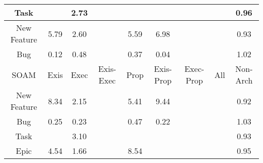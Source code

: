\begin{tabular}{|c||c|c|c|c|c|c|c|c|}
\hline
Task &  & \cellcolor[rgb]{0.9031359919544031,0.836748627767875,0.42} 2.73 &  &  &  &  &  & \cellcolor[rgb]{0.903809566671528,0.8106986155785654,0.4142222622267594} 0.96 \\ 
\hline
New Feature & \cellcolor[rgb]{0.8910131471165075,0.8310062275815036,0.42} 5.79 & \cellcolor[rgb]{0.9036683057320163,0.8370007763993761,0.42} 2.60 &  & \cellcolor[rgb]{0.8918075653773483,0.8313825309682176,0.42} 5.59 & \cellcolor[rgb]{0.8862944058545417,0.8287710343521514,0.42} 6.98 &  &  & \cellcolor[rgb]{0.8984855829276015,0.7854984258573136,0.40925321073242804} 0.93 \\ 
\hline
Bug & \cellcolor[rgb]{0.7720169098155485,0.1868800397935963,0.29121578249451197} 0.12 & \cellcolor[rgb]{0.8292482735436717,0.4577751614400464,0.34463172197409364} 0.48 &  & \cellcolor[rgb]{0.8121367712742666,0.37678071736486163,0.3286609865226488} 0.37 & \cellcolor[rgb]{0.76,0.13,0.28} 0.04 &  &  & \cellcolor[rgb]{0.9099289440633023,0.839966341924722,0.42} 1.02 \\ 
\hline
\hline
SOAM & Exis & Exec & Exis-Exec & Prop & Exis-Prop & Exec-Prop & All & Non-Arch \\ 
\hline
New Feature & \cellcolor[rgb]{0.8809441516260168,0.8262367034017974,0.42} 8.34 & \cellcolor[rgb]{0.9054452823761975,0.8378425021781988,0.42} 2.15 &  & \cellcolor[rgb]{0.8925251898831912,0.8317224583657221,0.42} 5.41 & \cellcolor[rgb]{0.8765612264902435,0.8241605809690626,0.42} 9.44 &  &  & \cellcolor[rgb]{0.8968157959473898,0.7775947674843112,0.40769474288423035} 0.92 \\ 
\hline
Bug & \cellcolor[rgb]{0.7921872601354328,0.2823530313077155,0.31004144279307067} 0.25 & \cellcolor[rgb]{0.7899709581221919,0.27186253511170816,0.3079728942473791} 0.23 &  & \cellcolor[rgb]{0.826353843986855,0.4440748615377802,0.3419302543877313} 0.47 & \cellcolor[rgb]{0.7885023836327227,0.2649112825282208,0.30660222472387455} 0.22 &  &  & \cellcolor[rgb]{0.9098791948360564,0.8399427765012898,0.42} 1.03 \\ 
\hline
Task &  & \cellcolor[rgb]{0.901669685884704,0.8360540617348596,0.42} 3.10 &  &  &  &  &  & \cellcolor[rgb]{0.8990653133202509,0.7882424830491873,0.40979429243223414} 0.93 \\ 
\hline
Epic & \cellcolor[rgb]{0.8959598325787251,0.833349394379396,0.42} 4.54 & \cellcolor[rgb]{0.9073923475182062,0.8387647961928345,0.42} 1.66 &  & \cellcolor[rgb]{0.8801521721405156,0.8258615552244546,0.42} 8.54 &  &  &  & \cellcolor[rgb]{0.9016980373380418,0.8007040434000645,0.41225150151550566} 0.95 \\ 

\end{tabular}
